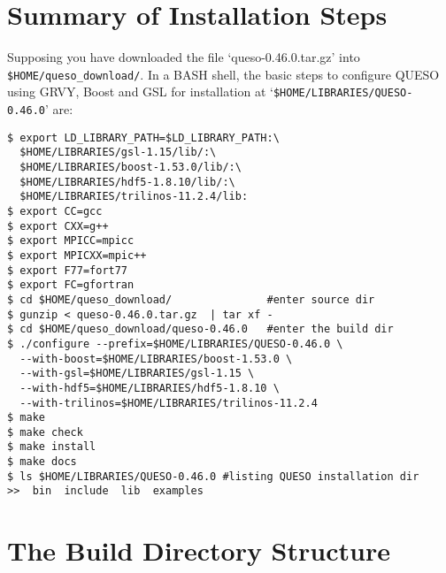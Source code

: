 \section{Summary of Installation Steps}\label{sec:summary}


Supposing you have downloaded the file `queso-0.46.0.tar.gz' into \texttt{\$HOME/queso\_download/}.
%
In a BASH shell, the basic steps to configure QUESO using GRVY, Boost and GSL for installation at 
`\verb+$HOME/LIBRARIES/QUESO-0.46.0+'  are:

\begin{lstlisting}
$ export LD_LIBRARY_PATH=$LD_LIBRARY_PATH:\
  $HOME/LIBRARIES/gsl-1.15/lib/:\
  $HOME/LIBRARIES/boost-1.53.0/lib/:\
  $HOME/LIBRARIES/hdf5-1.8.10/lib/:\
  $HOME/LIBRARIES/trilinos-11.2.4/lib:
$ export CC=gcc
$ export CXX=g++
$ export MPICC=mpicc
$ export MPICXX=mpic++
$ export F77=fort77
$ export FC=gfortran
$ cd $HOME/queso_download/               #enter source dir
$ gunzip < queso-0.46.0.tar.gz  | tar xf -
$ cd $HOME/queso_download/queso-0.46.0   #enter the build dir
$ ./configure --prefix=$HOME/LIBRARIES/QUESO-0.46.0 \
  --with-boost=$HOME/LIBRARIES/boost-1.53.0 \
  --with-gsl=$HOME/LIBRARIES/gsl-1.15 \
  --with-hdf5=$HOME/LIBRARIES/hdf5-1.8.10 \
  --with-trilinos=$HOME/LIBRARIES/trilinos-11.2.4
$ make 
$ make check
$ make install 
$ make docs
$ ls $HOME/LIBRARIES/QUESO-0.46.0 #listing QUESO installation dir
>>  bin  include  lib  examples
\end{lstlisting}

% 
% 


\section{The Build Directory Structure} \label{sc-source-dir-structure}

